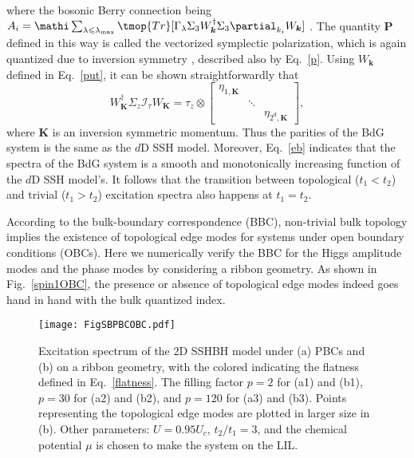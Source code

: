 where the bosonic Berry connection being $A_i = \mathi \sum_{\lambda\leq\lambda_{\text{max}}} \tmop{Tr} [\Gamma_\lambda \Sigma_3 W_{\bm{k}}^{\dag} \Sigma_3 \partial_{k_i} W_{\bm{k}}]$ \cite{Shindou2013}.
The quantity $\bm{P}$ defined in this way is called the vectorized symplectic polarization,
which is again quantized due to inversion symmetry \cite{Engelhardt2015},
described also by Eq.~\eqref{p}.
Using $W_{\bm{k}}$ defined in Eq.~\eqref{put},
it can be shown straightforwardly that
\begin{equation}
  W_{\bm{K}}^{\dag} \Sigma_z \mathcal{I}_\tau W_{\bm{K}} = \tau_z
  \otimes \begin{bmatrix}
      \eta_{1,\bm{K}} & &\\
      & \ddots & \\
      & & \eta_{2^d,\bm{K}}
  \end{bmatrix} ,\nonumber
\end{equation}
where $\bm{K}$ is an inversion symmetric momentum.
Thus the parities of the BdG system is the same as the $d$D SSH model.
Moreover,
Eq.~\eqref{eb} indicates that the spectra of the BdG system is a smooth and monotonically increasing function of the $d$D SSH model's.
It follows that the transition between topological ($t_1 < t_2$) and trivial ($t_1 > t_2$) excitation spectra also happens at $t_1 = t_2$.

According to the bulk-boundary correspondence (BBC),
non-trivial bulk topology implies the existence of topological edge modes for systems under open boundary conditions (OBCs).
Here we numerically verify the BBC for the Higgs amplitude modes and the phase modes by considering a ribbon geometry.
As shown in Fig.~\ref{spin1OBC},
the presence or absence of topological edge modes indeed goes hand in hand with the bulk quantized index.

\begin{figure*}
    \texttt{[image: FigSBPBCOBC.pdf]}
    \caption{\label{pbcobc}Excitation spectrum of the 2D SSHBH model under (a) PBCs  and (b) on a ribbon geometry,
    with the colored indicating the flatness defined in Eq.~\eqref{flatness}.
    The filling factor $p=2$ for (a1) and (b1),
    $p=30$ for (a2) and (b2),
    and $p=120$ for (a3) and (b3).
    Points representing the topological edge modes are plotted in larger size in (b).
    Other parameters:
    $U=0.95 U_c$, $t_2/t_1=3$, and the chemical potential $\mu$ is chosen to make the system on the LIL.}
\end{figure*}
